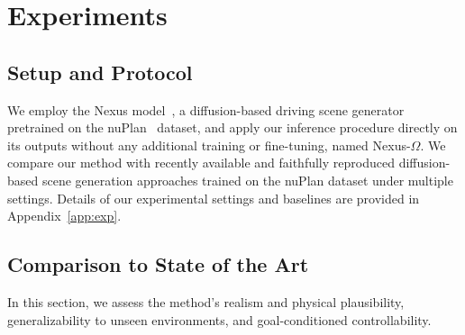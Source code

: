 \documentclass[10pt,twocolumn,letterpaper]{article}
\theoremstyle{plain}
\theoremstyle{remark}
\begin{document}
\section{Experiments}
\label{sec:experiment}

\subsection{Setup and Protocol}

We employ the Nexus model~\cite{zhou2025decoupled}, a diffusion-based driving scene generator pretrained on the nuPlan~\cite{caesar2021nuplan} dataset, and apply our inference procedure directly on its outputs without any additional training or fine-tuning, named Nexus-$\Omega$. We compare our method with recently available and faithfully reproduced diffusion-based scene generation approaches trained on the nuPlan dataset under multiple settings. Details of our experimental settings and baselines are provided in Appendix~\ref{app:exp}.


\subsection{Comparison to State of the Art}
In this section, we assess the method’s realism and physical plausibility, generalizability to unseen environments, and goal-conditioned controllability.

\begin{table}[t]
\centering
\caption{%
\textbf{Comparison on goal-conditioned controllability.} 
Each method is evaluated by setting multiple user-defined goal points for the target vehicle to test controllability. }
\vspace{-9pt}
\label{tab:controllability}
\vspace{-9pt}
\end{table}
\end{document}
